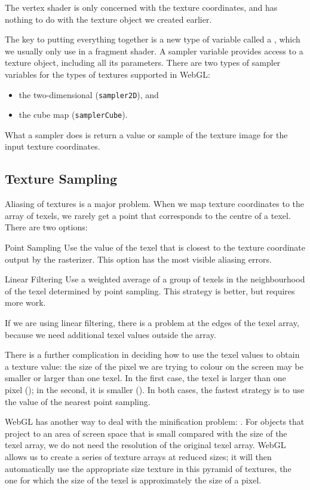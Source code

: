 \documentclass[../COS3712_Notes.tex]{subfiles}
\begin{document}
        The vertex shader is only concerned with the texture coordinates,
        and has nothing to do with the texture object we created earlier.

        The key to putting everything together is a new type of variable called a ,
        which we usually only use in a fragment shader.
        A sampler variable provides access to a texture object, including all its parameters.
        There are two types of sampler variables for the types of textures supported in WebGL:
        \begin{itemize}
          \item the two-dimensional (\texttt{sampler2D}), and
          \item the cube map (\texttt{samplerCube}).
        \end{itemize}
        What a sampler does is return a value or sample of the texture image
        for the input texture coordinates.

      \subsection{Texture Sampling}
        Aliasing of textures is a major problem.
        When we map texture coordinates to the array of texels, we rarely get a point
        that corresponds to the centre of a texel.
        There are two options:
        \begin{descriptimize}
          \item[Point Sampling] Use the value of the texel that is closest to the texture
            coordinate output by the rasterizer.
            This option has the most visible aliasing errors.
          \item[Linear Filtering] Use a weighted average of a group of texels in the neighbourhood
            of the texel determined by point sampling.
            This strategy is better, but requires more work.
        \end{descriptimize}
        If we are using linear filtering, there is a problem at the edges of the texel array,
        because we need additional texel values outside the array.

        There is a further complication in deciding how to use the texel values to obtain
        a texture value: the size of the pixel we are trying to colour on the screen
        may be smaller or larger than one texel.
        In the first case, the texel is larger than one pixel ();
        in the second, it is smaller ().
        In both cases, the fastest strategy is to use the value of the nearest point sampling.

        WebGL has another way to deal with the minification problem: .
        For objects that project to an area of screen space that is small compared with the size
        of the texel array, we do not need the resolution of the original texel array.
        WebGL allows us to create a series of texture arrays at reduced sizes;
        it will then automatically use the appropriate size texture in this pyramid of textures,
        the one for which the size of the texel is approximately the size of a pixel.
\end{document}

